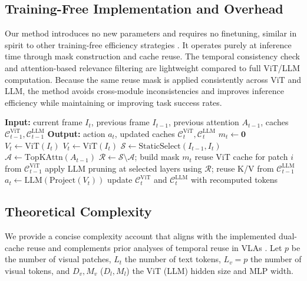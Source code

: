 \documentclass[11pt]{article}
\begin{document}
\subsection{Training-Free Implementation and Overhead}
Our method introduces no new parameters and requires no finetuning, similar in spirit to other training-free efficiency strategies \citep{yang2025efficientvla}. It operates purely at inference time through mask construction and cache reuse. The temporal consistency check and attention-based relevance filtering are lightweight compared to full ViT/LLM computation. Because the same reuse mask is applied consistently across ViT and LLM, the method avoids cross-module inconsistencies and improves inference efficiency while maintaining or improving task success rates.

\begin{algorithm}[t]
\caption{Coordinated Dual-Cache Inference}
\label{alg:dual_cache}
\begin{algorithmic}
\STATE \textbf{Input:} current frame $I_t$, previous frame $I_{t-1}$, previous attention $A_{t-1}$, caches $\mathcal{C}^{\text{ViT}}_{t-1}, \mathcal{C}^{\text{LLM}}_{t-1}$
\STATE \textbf{Output:} action $a_t$, updated caches $\mathcal{C}^{\text{ViT}}_{t}, \mathcal{C}^{\text{LLM}}_{t}$
    \STATE $m_t \leftarrow \mathbf{0}$ 
    \STATE $V_t \leftarrow \text{ViT}(I_t)$
\ELSE
    \STATE $V_t \leftarrow \text{ViT}(I_t)$ 
    \STATE $\mathcal{S} \leftarrow \text{StaticSelect}(I_{t-1}, I_t)$ 
    \STATE $\mathcal{A} \leftarrow \text{TopKAttn}(A_{t-1})$ 
    \STATE $\mathcal{R} \leftarrow \mathcal{S} \setminus \mathcal{A}$; build mask $m_t$
            \STATE reuse ViT cache for patch $i$ from $\mathcal{C}^{\text{ViT}}_{t-1}$
        \ENDIF
    \ENDFOR
\ENDIF
\STATE apply LLM pruning at selected layers using $\mathcal{R}$; reuse K/V from $\mathcal{C}^{\text{LLM}}_{t-1}$
\STATE $a_t \leftarrow \text{LLM}(\text{Project}(V_t))$
\STATE update $\mathcal{C}^{\text{ViT}}_{t}$ and $\mathcal{C}^{\text{LLM}}_{t}$ with recomputed tokens
\end{algorithmic}
\end{algorithm}

\subsection{Theoretical Complexity}
We provide a concise complexity account that aligns with the implemented dual-cache reuse and complements prior analyses of temporal reuse in VLAs \citep{xu2025vla,liu2025ttf}. Let $p$ be the number of visual patches, $L_t$ the number of text tokens, $L_v=p$ the number of visual tokens, and $D_v, M_v$ ($D_l, M_l$) the ViT (LLM) hidden size and MLP width.
\end{document}
